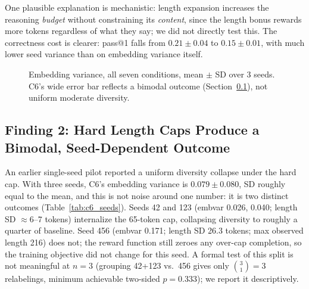 \documentclass{article}
\begin{document}
One plausible explanation is mechanistic: length expansion increases the reasoning \emph{budget} without constraining its \emph{content}, since the length bonus rewards more tokens regardless of what they say; we did not directly test this. The correctness cost is clearer: pass@1 falls from $0.21\pm0.04$ to $0.15\pm0.01$, with much lower seed variance than on embedding variance itself.

\begin{figure}[t]
\centering
{}
\caption{Embedding variance, all seven conditions, mean $\pm$ SD over 3 seeds. C6's wide error bar reflects a bimodal outcome (Section~\ref{sec:c6instability}), not uniform moderate diversity.}
\label{fig:embedding_variance}
\end{figure}

\subsection{Finding 2: Hard Length Caps Produce a Bimodal, Seed-Dependent Outcome}
\label{sec:c6instability}

An earlier single-seed pilot reported a uniform diversity collapse under the hard cap. With three seeds, C6's embedding variance is $0.079\pm0.080$, SD roughly equal to the mean, and this is not noise around one number: it is two distinct outcomes (Table~\ref{tab:c6_seeds}). Seeds 42 and 123 (embvar 0.026, 0.040; length SD $\approx$6--7 tokens) internalize the 65-token cap, collapsing diversity to roughly a quarter of baseline. Seed 456 (embvar 0.171; length SD 26.3 tokens; max observed length 216) does not; the reward function still zeroes any over-cap completion, so the training objective did not change for this seed. A formal test of this split is not meaningful at $n=3$ (grouping 42+123 vs.\ 456 gives only $\binom{3}{1}=3$ relabelings, minimum achievable two-sided $p=0.333$); we report it descriptively.
\end{document}
